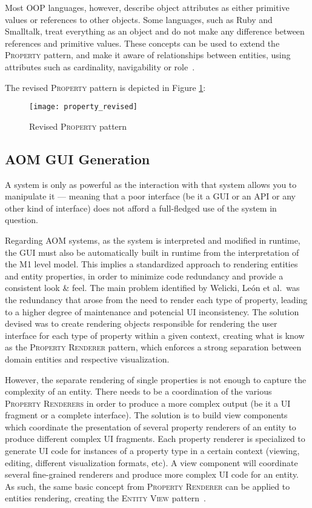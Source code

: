 Most OOP languages, however, describe object attributes as either primitive values or references to other objects. Some languages, such as Ruby and Smalltalk, treat everything as an object and do not make any difference between references and primitive values. These concepts can be used to extend the \textsc{Property} pattern, and make it aware of relationships between entities, using attributes such as cardinality, navigability or role~\cite{aom_research_roadmap}.

The revised \textsc{Property} pattern is depicted in Figure \ref{fig:property_revised}:

\begin{figure}[H]
  \centering
  \texttt{[image: property\_revised]}
  \caption{Revised \textsc{Property} pattern}
  \label{fig:property_revised}
\end{figure}

\subsection{AOM GUI Generation}\label{sec:aom_gui_generation}

A system is only as powerful as the interaction with that system allows you to manipulate it --- meaning that a poor interface (be it a GUI or an API or any other kind of interface) does not afford a full-fledged use of the system in question.

Regarding AOM systems, as the system is interpreted and modified in runtime, the GUI must also be automatically built in runtime from the interpretation of the M1 level model. This implies a standardized approach to rendering entities and entity properties, in order to minimize code redundancy and provide a consistent look \& feel. The main problem identified by Welicki, León et al.\ was the redundancy that arose from the need to render each type of property, leading to a higher degree of maintenance and potencial UI inconsistency. The solution devised was to create rendering objects responsible for rendering the user interface for each type of property within a given context, creating what is know as the \textsc{Property Renderer} pattern, which enforces a strong separation between domain entities and respective visualization.

However, the separate rendering of single properties is not enough to capture the complexity of an entity. There needs to be a coordination of the various \textsc{Property Renderers} in order to produce a more complex output (be it a UI fragment or a complete interface). The solution is to build view components which coordinate the presentation of several property renderers of an entity to produce different complex UI fragments. Each property renderer is specialized to generate UI code for instances of a property type in a certain context (viewing, editing, different visualization formats, etc). A view component will coordinate several fine-grained renderers and produce more complex UI code for an entity. As such, the same basic concept from \textsc{Property Renderer} can be applied to entities rendering, creating the \textsc{Entity View} pattern~\cite{WYW07}.

